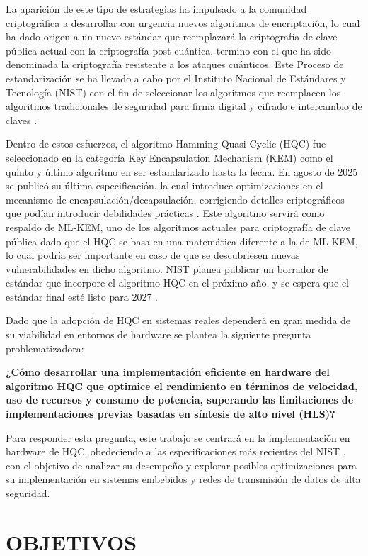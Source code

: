 La aparición de este tipo de estrategias ha impulsado a la comunidad criptográfica a desarrollar con urgencia nuevos algoritmos de encriptación, lo cual ha dado origen a un nuevo estándar que reemplazará la criptografía de clave pública actual con la criptografía post-cuántica, termino con el que ha sido denominada la criptografía resistente a los ataques cuánticos. Este Proceso de estandarización se ha llevado a cabo por el Instituto Nacional de Estándares y Tecnología (NIST) con el fin de seleccionar los algoritmos que reemplacen los algoritmos tradicionales de seguridad para firma digital y cifrado e intercambio de claves \cite{CISA2022PreparePQC}.

Dentro de estos esfuerzos, el algoritmo Hamming Quasi-Cyclic (HQC) fue seleccionado en la categoría Key Encapsulation Mechanism (KEM) como el quinto y último algoritmo en ser estandarizado hasta la fecha. En agosto de 2025 se publicó su última especificación, la cual introduce optimizaciones en el mecanismo de encapsulación/decapsulación, corrigiendo detalles criptográficos que podían introducir debilidades prácticas \cite{HQCspec2025}. Este algoritmo servirá como respaldo de ML-KEM, uno de los algoritmos actuales para criptografía de clave pública dado que el HQC se basa en una matemática diferente a la de ML-KEM, lo cual podría ser importante en caso de que se descubriesen nuevas vulnerabilidades en dicho algoritmo. NIST planea publicar un borrador de estándar que incorpore el algoritmo HQC en el próximo año, y se espera que el estándar final esté listo para 2027 \cite{NIST2025SelectHQC}.

Dado que la adopción de HQC en sistemas reales dependerá en gran medida de su viabilidad en entornos de hardware se plantea la siguiente pregunta problematizadora:

\textbf{¿Cómo desarrollar una implementación eficiente en hardware del algoritmo HQC que optimice el rendimiento en términos de velocidad, uso de recursos y consumo de potencia, superando las limitaciones de implementaciones previas basadas en síntesis de alto nivel (HLS)?}

Para responder esta pregunta, este trabajo se centrará en la implementación en hardware de HQC, obedeciendo a las especificaciones más recientes del NIST \cite{HQCspec2025}, con el objetivo de analizar su desempeño y explorar posibles optimizaciones para su implementación en sistemas embebidos y redes de transmisión de datos de alta seguridad.

\newpage
\section{OBJETIVOS}
